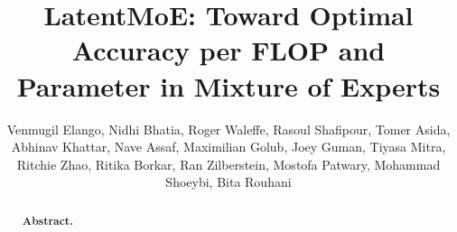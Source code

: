 \documentclass[11pt, logo, onecolumn, copyright, colorlinks=true, allcolors=blue]{nvidiatechreport}
\title{LatentMoE: Toward Optimal Accuracy per FLOP and Parameter in Mixture of Experts}
\author{\large Venmugil Elango, Nidhi Bhatia, Roger Waleffe, Rasoul Shafipour, Tomer Asida, Abhinav Khattar, Nave Assaf, Maximilian Golub, Joey Guman, Tiyasa Mitra, Ritchie Zhao, Ritika Borkar, Ran Zilberstein, Mostofa Patwary, Mohammad Shoeybi, Bita Rouhani}
\date{}
\begin{document}
\makeatletter
\DeclareRobustCommand\onedot{\futurelet\@let@token\@onedot}
\def\@onedot{\ifx\@let@token.\else.\null\fi\xspace}

\def\eg{\emph{e.g}\onedot} \def\Eg{\emph{E.g}\onedot}
\def\ie{\emph{i.e}\onedot} \def\Ie{\emph{I.e}\onedot}
\def\cf{\emph{c.f}\onedot} \def\Cf{\emph{C.f}\onedot}
\def\etc{\emph{etc}\onedot} \def\vs{\emph{vs}\onedot}
\def\wrt{w.r.t\onedot} \def\dof{d.o.f\onedot}
\def\etal{\emph{et al}\onedot}
\makeatother

\newcommand{\todo}[1]{\textcolor{red}{TODO: #1}}
\newcommand{\R}{\mathbb{R}}
\newcommand{\act}{\operatorname{ACT}}
\newcommand{\topk}{\operatorname{TopK}}
\newcommand{\softmax}{\operatorname{Softmax}}
\newcommand{\moe}{\operatorname{MoE}}
\newcommand{\latentmoe}{\operatorname{\ell-MoE}}
\newcommand{\lmoeeff}{\latentmoe_\mathrm{eff}}
\newcommand{\lmoeacc}{\latentmoe_\mathrm{acc}}
\newcommand{\lmoeefflarge}{\latentmoe_\mathrm{eff-12B}}
\newcommand{\wfconei}{\ensuremath{W_{\text{FC1}}^{(i)}}}
\newcommand{\wfctwoi}{\ensuremath{W_{\text{FC2}}^{(i)}}}
\newcommand{\wgatei}{\ensuremath{W_{\text{gate}}^{(i)}}}
\newcommand{\nvlinkbw}{\mathrm{BW}_\mathrm{NVL}}
\newcommand{\hbmbw}{\mathrm{BW}_\mathrm{HBM}}
\newcommand{\ep}{\mathrm{EP}}
\newcommand{\ttotal}{t_\mathrm{total}}
\newcommand{\texp}{t_\mathrm{exp}}

\begin{abstract}
\large \textbf{Abstract.}

\end{abstract}

\maketitle










\end{document}

